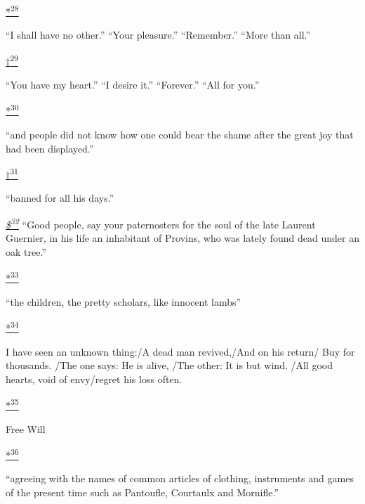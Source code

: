 \protect\hypertarget{23_NOTES.xhtmlux5cux23id_2620}{\protect\hyperlink{18_Chapter_Eleven__THE_FORMS_OF_THO.xhtmlux5cux23id_2619}{*\textsuperscript{28}}}
``I shall have no other.'' ``Your pleasure.'' ``Remember.'' ``More than
all.''

\protect\hypertarget{23_NOTES.xhtmlux5cux23id_2622}{\protect\hyperlink{18_Chapter_Eleven__THE_FORMS_OF_THO.xhtmlux5cux23id_2621}{†\textsuperscript{29}}}
``You have my heart.'' ``I desire it.'' ``Forever.'' ``All for you.''

\protect\hypertarget{23_NOTES.xhtmlux5cux23id_2624}{\protect\hyperlink{18_Chapter_Eleven__THE_FORMS_OF_THO.xhtmlux5cux23id_2623}{*\textsuperscript{30}}}
``and people did not know how one could bear the shame after the great
joy that had been displayed.''

\protect\hypertarget{23_NOTES.xhtmlux5cux23id_2626}{\protect\hyperlink{18_Chapter_Eleven__THE_FORMS_OF_THO.xhtmlux5cux23id_2625}{†\textsuperscript{31}}}
``banned for all his days.''

\emph{\protect\hypertarget{23_NOTES.xhtmlux5cux23id_2628}{\protect\hyperlink{18_Chapter_Eleven__THE_FORMS_OF_THO.xhtmlux5cux23id_2627}{\$\textsuperscript{32}}}}
``Good people, say your paternosters for the soul of the late Laurent
Guernier, in his life an inhabitant of Provins, who was lately found
dead under an oak tree.''

\protect\hypertarget{23_NOTES.xhtmlux5cux23id_2630}{\protect\hyperlink{18_Chapter_Eleven__THE_FORMS_OF_THO.xhtmlux5cux23id_2629}{*\textsuperscript{33}}}
``the children, the pretty scholars, like innocent lambs''

\protect\hypertarget{23_NOTES.xhtmlux5cux23id_2632}{\protect\hyperlink{18_Chapter_Eleven__THE_FORMS_OF_THO.xhtmlux5cux23id_2631}{*\textsuperscript{34}}}
I have seen an unknown thing:/A dead man revived,/And on his return/ Buy
for thousands. /The one says: He is alive, /The other: It is but wind.
/All good hearts, void of envy/regret his loss often.

\protect\hypertarget{23_NOTES.xhtmlux5cux23id_2348}{\protect\hyperlink{18_Chapter_Eleven__THE_FORMS_OF_THO.xhtmlux5cux23id_2347}{*\textsuperscript{35}}}
Free Will

\protect\hypertarget{23_NOTES.xhtmlux5cux23id_2634}{\protect\hyperlink{18_Chapter_Eleven__THE_FORMS_OF_THO.xhtmlux5cux23id_2633}{*\textsuperscript{36}}}
``agreeing with the names of common articles of clothing, instruments
and games of the present time such as Pantoufle, Courtaulx and
Mornifle.''

